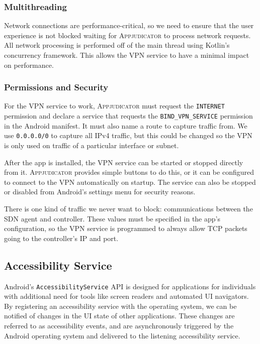 \subsubsection{Multithreading}
\label{sec:multithreading}

Network connections are performance-critical, so we need to ensure that the user
experience is not blocked waiting for \textsc{Appjudicator} to process network
requests. All network processing is performed off of the main thread using
Kotlin's concurrency framework. This allows the VPN service to have a minimal
impact on performance.

\subsubsection{Permissions and Security}
\label{sec:vpn-permissions}

For the VPN service to work, \textsc{Appjudicator} must request the
\texttt{INTERNET} permission and declare a service that requests the
\texttt{BIND\_VPN\_SERVICE} permission in the Android manifest. It must also
name a route to capture traffic from. We use \texttt{0.0.0.0/0} to capture all
IPv4 traffic, but this could be changed so the VPN is only used on traffic of a
particular interface or subnet.

After the app is installed, the VPN service can be started or stopped directly
from it. \textsc{Appjudicator} provides simple buttons to do this, or it can be
configured to connect to the VPN automatically on startup. The service can also
be stopped or disabled from Android's settings menu for security reasons.

There is one kind of traffic we never want to block: communications between the
SDN agent and controller. These values must be specified in the app's
configuration, so the VPN service is programmed to always allow TCP packets
going to the controller's IP and port.

\subsection{Accessibility Service}
\label{sec:implementation-accessibility-service}

Android's \texttt{AccessibilityService} API is designed for applications for
individuals with additional need for tools like screen readers and automated UI
navigators. By registering an accessibility service with the operating system,
we can be notified of changes in the UI state of other applications. These
changes are referred to as accessibility events, and are asynchronously
triggered by the Android operating system and delivered to the listening
accessibility service.

